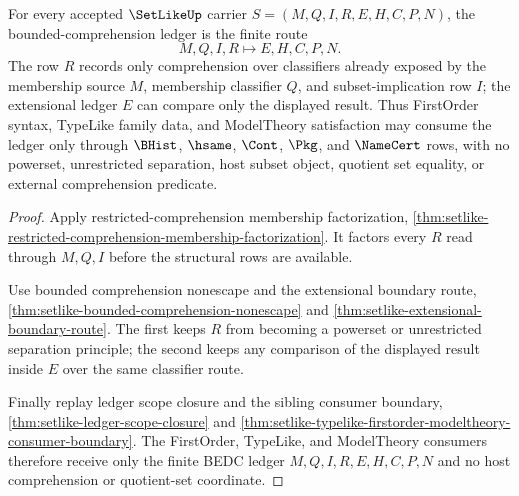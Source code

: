 \begin{theorem}
\label{thm:setlike-bounded-comprehension-ledger}
For every accepted $\SetLikeUp$ carrier $S=(M,Q,I,R,E,H,C,P,N)$, the bounded-comprehension ledger is the finite route
$$
M,Q,I,R \longmapsto E,H,C,P,N .
$$
The row $R$ records only comprehension over classifiers already exposed by the membership source $M$, membership classifier $Q$, and subset-implication row $I$; the extensional ledger $E$ can compare only the displayed result. Thus FirstOrder syntax, TypeLike family data, and ModelTheory satisfaction may consume the ledger only through $\BHist$, $\hsame$, $\Cont$, $\Pkg$, and $\NameCert$ rows, with no powerset, unrestricted separation, host subset object, quotient set equality, or external comprehension predicate.
\end{theorem}
\begin{proof}
Apply restricted-comprehension membership factorization, \autoref{thm:setlike-restricted-comprehension-membership-factorization}. It factors every $R$ read through $M,Q,I$ before the structural rows are available.

Use bounded comprehension nonescape and the extensional boundary route, \autoref{thm:setlike-bounded-comprehension-nonescape} and \autoref{thm:setlike-extensional-boundary-route}. The first keeps $R$ from becoming a powerset or unrestricted separation principle; the second keeps any comparison of the displayed result inside $E$ over the same classifier route.

Finally replay ledger scope closure and the sibling consumer boundary, \autoref{thm:setlike-ledger-scope-closure} and \autoref{thm:setlike-typelike-firstorder-modeltheory-consumer-boundary}. The FirstOrder, TypeLike, and ModelTheory consumers therefore receive only the finite BEDC ledger $M,Q,I,R,E,H,C,P,N$ and no host comprehension or quotient-set coordinate.
\end{proof}

